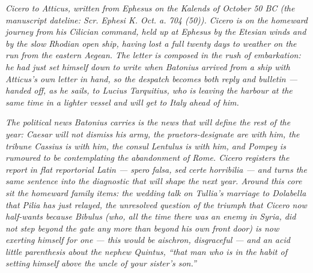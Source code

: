 
\textit{Cicero to Atticus, written from Ephesus on the
Kalends of October 50 BC (the manuscript dateline:
\textit{Scr. Ephesi K. Oct. a. 704 (50)}). Cicero is on
the homeward journey from his Cilician command, held up
at Ephesus by the Etesian winds and by the slow Rhodian
open ship, having lost a full twenty days to weather on
the run from the eastern Aegean. The letter is composed
in the rush of embarkation: he had just set himself
down to write when Batonius arrived from a ship with
Atticus's own letter in hand, so the despatch becomes
both reply and bulletin --- handed off, as he sails, to
Lucius Tarquitius, who is leaving the harbour at the
same time in a lighter vessel and will get to Italy
ahead of him.}

\textit{The political news Batonius carries is the
news that will define the rest of the year: Caesar will
not dismiss his army, the praetors-designate are with
him, the tribune Cassius is with him, the consul
Lentulus is with him, and Pompey is rumoured to be
contemplating the abandonment of Rome. Cicero registers
the report in flat reportorial Latin --- \textit{spero
falsa, sed certe horribilia} --- and turns the same
sentence into the diagnostic that will shape the next
year. Around this core sit the homeward family items:
the wedding talk on Tullia's marriage to Dolabella that
Pilia has just relayed, the unresolved question of the
triumph that Cicero now half-wants because Bibulus
(who, all the time there was an enemy in Syria, did not
step beyond the gate any more than beyond his own front
door) is now exerting himself for one --- this would be
\textit{aischron}, disgraceful --- and an acid little
parenthesis about the nephew Quintus, ``that man who is
in the habit of setting himself above the uncle of your
sister's son.''}
